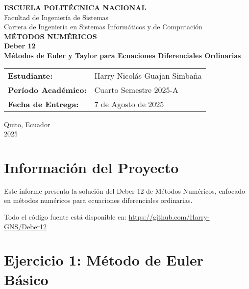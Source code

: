 \documentclass[12pt,a4paper]{article}
\begin{document}
\begin{titlepage}
    \centering
    
    \vspace*{2cm}
    
    {\Large \textbf{ESCUELA POLITÉCNICA NACIONAL}}\\[1cm]
    {\large Facultad de Ingeniería de Sistemas}\\[1cm]
    {\large Carrera de Ingeniería en Sistemas Informáticos y de Computación}\\[2cm]
    
    {\Huge \textbf{MÉTODOS NUMÉRICOS}}\\[1cm]
    {\LARGE \textbf{Deber 12}}\\[0.5cm]
    {\Large \textbf{Métodos de Euler y Taylor para Ecuaciones Diferenciales Ordinarias}}\\[2cm]
    
    \begin{tabular}{ll}
        \textbf{Estudiante:} & Harry Nicolás Guajan Simbaña \\[0.3cm]
        \textbf{Período Académico:} & Cuarto Semestre 2025-A \\[0.3cm]
        \textbf{Fecha de Entrega:} & 7 de Agosto de 2025 \\[0.3cm]
    \end{tabular}
    
    \vfill
    
    {\large Quito, Ecuador}\\
    {\large 2025}
    
\end{titlepage}

\thispagestyle{empty}
\newpage

\section{Información del Proyecto}

Este informe presenta la solución del Deber 12 de Métodos Numéricos, enfocado en métodos numéricos para ecuaciones diferenciales ordinarias.

Todo el código fuente está disponible en: \url{https://github.com/Harry-GNS/Deber12}

\section{Ejercicio 1: Método de Euler Básico}
\end{document}
